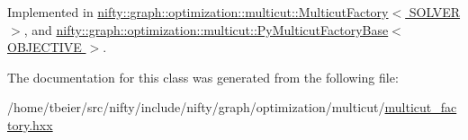 Implemented in \hyperlink{classnifty_1_1graph_1_1optimization_1_1multicut_1_1MulticutFactory_a2f8df1eca821874854cc1fe3b1e0b97f}{nifty\+::graph\+::optimization\+::multicut\+::\+Multicut\+Factory$<$ S\+O\+L\+V\+E\+R $>$}, and \hyperlink{classnifty_1_1graph_1_1optimization_1_1multicut_1_1PyMulticutFactoryBase_ae7a3abc9543bf9477616fab6d7de2d27}{nifty\+::graph\+::optimization\+::multicut\+::\+Py\+Multicut\+Factory\+Base$<$ O\+B\+J\+E\+C\+T\+I\+V\+E $>$}.



The documentation for this class was generated from the following file\+:\begin{DoxyCompactItemize}
\item 
/home/tbeier/src/nifty/include/nifty/graph/optimization/multicut/\hyperlink{multicut__factory_8hxx}{multicut\+\_\+factory.\+hxx}\end{DoxyCompactItemize}
